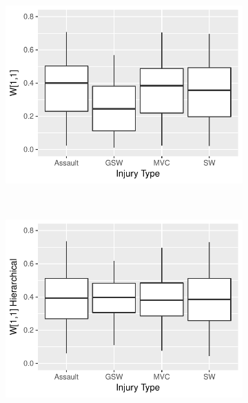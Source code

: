 \documentclass{article}
\begin{document}
\begin{figure}
    \centering
    \begin{subfigure}[b]{0.3\textwidth}
        \includegraphics[width=\textwidth]{shrinkageSep.pdf}
        \caption{}
        \label{fig:nonHierPosteriors}
    \end{subfigure}
    ~ %
    \begin{subfigure}[b]{0.3\textwidth}
        \includegraphics[width=\textwidth]{shrinkageHier.pdf}
        \caption{}
        \label{fig:hierPosteriors}
    \end{subfigure}
    ~ %

\end{figure}
\end{document}
